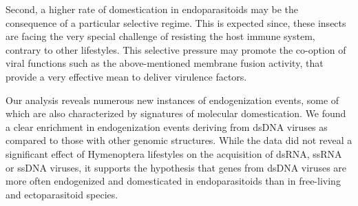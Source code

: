 Second, a higher rate of domestication in endoparasitoids may be the consequence of a particular selective regime. This is expected since, these insects are facing the very special challenge of resisting the host immune system, contrary to other lifestyles. This selective pressure may promote the co-option of viral functions such as the above-mentioned membrane fusion activity, that provide a very effective mean to deliver virulence factors. 

Our analysis reveals numerous new instances of endogenization events, some of which are also characterized by signatures of molecular domestication. We found a clear enrichment in endogenization events deriving from dsDNA viruses as compared to those with other genomic structures. While the data did not reveal a significant effect of Hymenoptera lifestyles on the acquisition of dsRNA, ssRNA or ssDNA viruses, it supports the hypothesis that genes from dsDNA viruses are more often endogenized and domesticated in endoparasitoids than in free-living and ectoparasitoid species.


